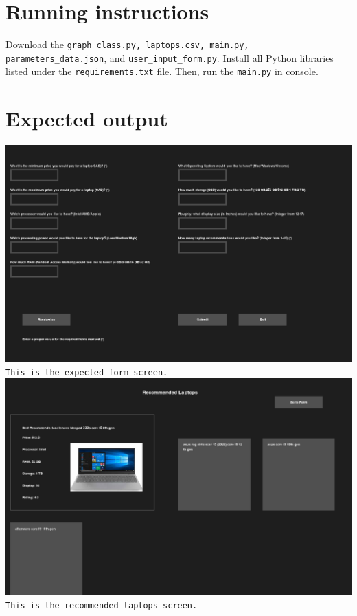 \documentclass{article}
\begin{document}
\section{Running instructions}
Download the \texttt{graph\_class.py, laptops.csv, main.py, parameters\_data.json}, and \texttt{user\_input\_form.py}.
Install all Python libraries listed under the \texttt{requirements.txt} file.
Then, run the \texttt{main.py} in console.

\section{Expected output}
\includegraphics[scale=0.1]{proj2_input_form.png}
\\
\texttt{This is the expected form screen.}
\\
\includegraphics[scale=0.1]{proj2_output_window.png}
\\
\texttt{This is the recommended laptops screen.}
\end{document}
